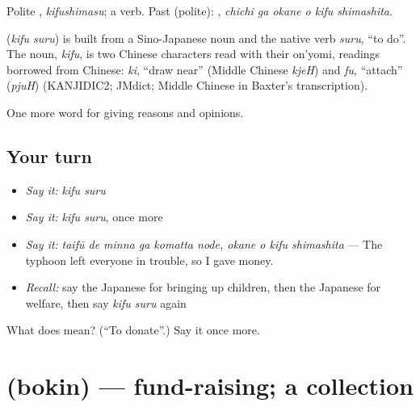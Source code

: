 Polite \textbf{}, \emph{kifushimasu}; a  verb. Past (polite): \textbf{  }, \emph{chichi ga okane o kifu shimashita}.

\begin{cousinweb}
\textbf{} (\emph{kifu suru}) is built from a Sino-Japanese noun and the native verb \emph{suru}, \textquotedblleft{}to do\textquotedblright{}. The noun, \emph{kifu}, is two Chinese characters read with their on'yomi, readings borrowed from Chinese: \emph{ki}, \textquotedblleft{}draw near\textquotedblright{} (Middle Chinese \emph{kjeH}) and \emph{fu}, \textquotedblleft{}attach\textquotedblright{} (\emph{pjuH}) (KANJIDIC2; JMdict; Middle Chinese in Baxter's transcription).
\end{cousinweb}

\begin{grammarlens}[title={What you've built}]
One more word for giving reasons and opinions.
\end{grammarlens}

\subsection*{Your turn}
\begin{itemize}
\raggedright
  \item \emph{Say it:} \emph{kifu suru}
  \item \emph{Say it:} \emph{kifu suru}, once more
  \item \emph{Say it:} \emph{taifū de minna ga komatta node, okane o kifu shimashita} — The typhoon left everyone in trouble, so I gave money.
  \item \emph{Recall:} say the Japanese for bringing up children, then the Japanese for welfare, then say \emph{kifu suru} again
\end{itemize}

\begin{tcolorbox}[breakable,colback=teal!4,colframe=teal!35!black,title={Before you move on}]
What does  mean? (\textquotedblleft{}To donate\textquotedblright{}.) Say it once more.
\end{tcolorbox}
\section[\texorpdfstring{\ja{ぼきん} (bokin)}{ぼきん (bokin)}]{ (bokin) — fund-raising; a collection}

\label{lesson:JA-C334-bokin}



